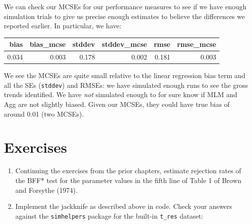 \documentclass[
]{book}
\newenvironment{Shaded}{\begin{snugshade}}{\end{snugshade}}
\newcommand{\AttributeTok}[1]{\textcolor[rgb]{0.13,0.29,0.53}{#1}}
\newcommand{\DecValTok}[1]{\textcolor[rgb]{0.00,0.00,0.81}{#1}}
\newcommand{\FunctionTok}[1]{\textcolor[rgb]{0.13,0.29,0.53}{\textbf{#1}}}
\newcommand{\NormalTok}[1]{#1}
\newcommand{\OtherTok}[1]{\textcolor[rgb]{0.56,0.35,0.01}{#1}}
\newcommand{\SpecialCharTok}[1]{\textcolor[rgb]{0.81,0.36,0.00}{\textbf{#1}}}
\newcommand{\StringTok}[1]{\textcolor[rgb]{0.31,0.60,0.02}{#1}}
\begin{document}
We can check our MCSEs for our performance measures to see if we have enough simulation trials to give us precise enough estimates to believe the differences we reported earlier.
In particular, we have:

\begin{Shaded}
\end{Shaded}

\begin{tabular}{r|r|r|r|r|r}
\hline
bias & bias\_mcse & stddev & stddev\_mcse & rmse & rmse\_mcse\\
\hline
0.034 & 0.003 & 0.178 & 0.002 & 0.181 & 0.003\\
\hline
\end{tabular}

We see the MCSEs are quite small relative to the linear regression bias term and all the SEs (\texttt{stddev}) and RMSEs: we have simulated enough runs to see the gross trends identified.
We have \emph{not} simulated enough to for sure know if MLM and Agg are not slightly biased. Given our MCSEs, they could have true bias of around 0.01 (two MCSEs).

\section{Exercises}\label{exercises-6}

\begin{enumerate}
\def\labelenumi{\arabic{enumi}.}
\item
  Continuing the exercises from the prior chapters, estimate rejection rates of the BFF* test for the parameter values in the fifth line of Table 1 of Brown and Forsythe (1974).
\item
  Implement the jackknife as described above in code. Check your answers against the \texttt{simhelpers} package for the built-in \texttt{t\_res} dataset:
\end{enumerate}
\end{document}
